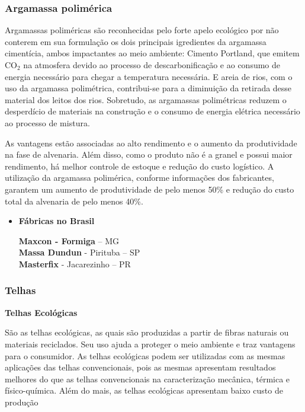 \subsubsection{Argamassa polimérica}

	Argamassas poliméricas são reconhecidas pelo forte apelo ecológico por não conterem em sua formulação os dois principais igredientes da argamassa cimentícia, ambos impactantes ao meio ambiente: Cimento Portland, que emitem CO$_2$ na atmosfera devido ao processo de descarbonificação e ao consumo de energia necessário para chegar a temperatura necessária. E areia de rios, com o uso da argamassa polimétrica, contribui-se para a diminuição da retirada desse material dos leitos dos rios. Sobretudo, as argamassas polimétricas reduzem o desperdício de materiais na construção e o consumo de energia elétrica necessário ao processo de mistura.\cite{Angulo2000}\cite{Portland1980}

	As vantagens estão associadas ao alto rendimento e o aumento da produtividade na fase de alvenaria. Além disso, como o produto não é a granel e possui maior rendimento, há melhor controle de estoque e redução do custo logístico. A utilização da argamassa polimérica, conforme informações dos fabricantes, garantem um aumento de produtividade de pelo menos 50\% e redução do custo total da alvenaria de pelo menos 40\%.

\begin{itemize}
\item \textbf{Fábricas no Brasil}

\textbf{Maxcon - Formiga} – MG\\
\textbf{Massa Dundun} - Pirituba – SP\\
\textbf{Masterfix} - Jacarezinho – PR
\end{itemize}

\subsubsection{Telhas}

\textbf{Telhas Ecológicas}

	São as telhas ecológicas, as quais são produzidas a partir de fibras naturais ou materiais reciclados. Seu uso ajuda a proteger o meio ambiente e traz vantagens para o consumidor. As telhas ecológicas podem ser utilizadas com as mesmas aplicações das telhas convencionais, pois as mesmas apresentam resultados melhores do que as telhas convencionais na caracterização mecânica, térmica e físico-química. Além do mais, as telhas ecológicas apresentam baixo custo de produção\\


